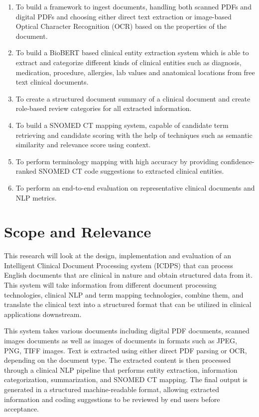 \begin{enumerate}

    \item To build a framework to ingest documents, handling both scanned PDFs and digital PDFs and choosing either direct text extraction or image-based Optical Character Recognition (OCR) based on the properties of the document.

    \item To build a BioBERT based clinical entity extraction system which is able to extract and categorize different kinds of clinical entities such as diagnosis, medication, procedure, allergies, lab values and anatomical locations from free text clinical documents.

    \item To create a structured document summary of a clinical document and create role-based review categories for all extracted information.

    \item To build a SNOMED CT mapping system, capable of candidate term retrieving and candidate scoring with the help of techniques such as semantic similarity and relevance score using context.

    \item To perform terminology mapping with high accuracy by providing confidence-ranked SNOMED CT code suggestions to extracted clinical entities.

    \item To perform an end-to-end evaluation on representative clinical documents and NLP metrics.
\end{enumerate}

\section{Scope and Relevance}

This research will look at the design, implementation and evaluation of an Intelligent Clinical Document Processing system (ICDPS) that can process English documents that are clinical in nature and obtain structured data from it. This system will take information from different document processing technologies, clinical NLP and term mapping technologies, combine them, and translate the clinical text into a structured format that can be utilized in clinical applications downstream.

This system takes various documents including digital PDF documents, scanned images documents as well as images of documents in formats such as JPEG, PNG, TIFF images. Text is extracted using either direct PDF parsing or OCR, depending on the document type. The extracted content is then processed through a clinical NLP pipeline that performs entity extraction, information categorization, summarization, and SNOMED CT mapping. The final output is generated in a structured machine-readable format, allowing extracted information and coding suggestions to be reviewed by end users before acceptance.

